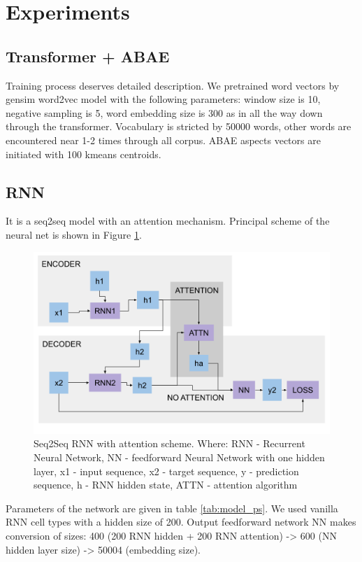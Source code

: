 \documentclass{article}
\begin{document}
\section{Experiments}

\subsection{Transformer + ABAE}
Training process deserves detailed description. We pretrained word vectors by gensim word2vec model with the following parameters: window size is 10, negative sampling is 5, word embedding size is 300 as in all the way down through the transformer. Vocabulary is stricted by 50000 words, other words are encountered near 1-2 times through all corpus.
ABAE aspects vectors are initiated with 100 kmeans centroids.

\subsection{RNN}
It is a seq2seq model with an attention mechanism. Principal scheme of the neural net is shown in Figure \ref{fig:rnn}.

\begin{figure}[H]
    \centering
    \includegraphics[width=1.0\linewidth]{rnn.png}
    \caption{Seq2Seq RNN with attention scheme. Where: RNN - Recurrent Neural Network, NN - feedforward Neural Network with one hidden layer,  x1 - input sequence, x2 - target sequence, y - prediction sequence,  h - RNN  hidden state, ATTN - attention algorithm}
    \label{fig:rnn}
\end{figure}

Parameters of the network are given in table \ref{tab:model_ps}. We used vanilla RNN cell types with a hidden size of 200. Output feedforward network NN makes conversion of sizes: 400 (200 RNN hidden + 200 RNN attention) -> 600 (NN hidden layer size) -> 50004 (embedding size).
\end{document}
